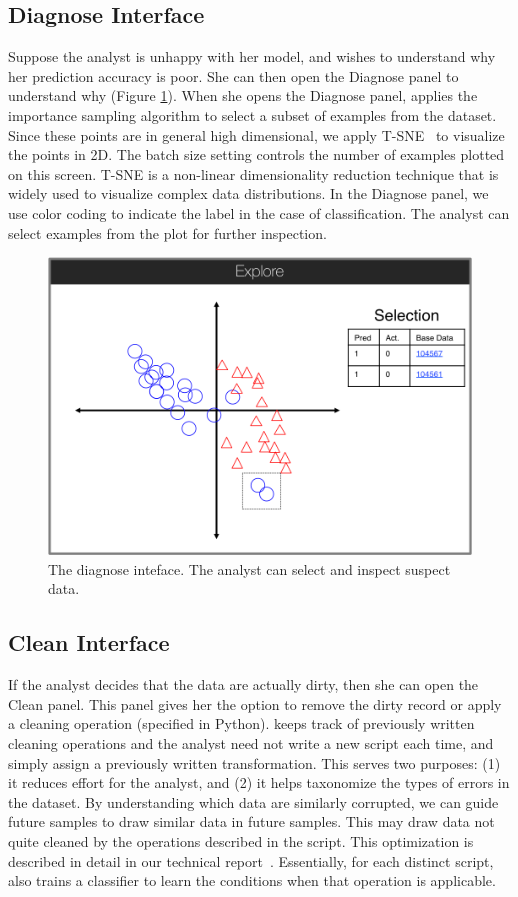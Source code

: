 \subsection{Diagnose Interface}
Suppose the analyst is unhappy with her model, and wishes to understand why her prediction accuracy is poor.
She can then open the \textsf{Diagnose} panel to understand why (Figure \ref{diag}).
When she opens the \textsf{Diagnose} panel, \sys applies the importance sampling algorithm to select a subset of examples from the dataset.
Since these points are in general high dimensional, we apply T-SNE~\cite{van2008visualizing} to visualize the points in 2D.
The batch size setting controls the number of examples plotted on this screen.
T-SNE is a non-linear dimensionality reduction technique that is widely used to visualize complex data distributions.
In the \textsf{Diagnose} panel, we use color coding to indicate the label in the case of classification.
The analyst can select examples from the plot for further inspection.

\begin{figure}[t]
\centering
 \includegraphics[width=0.6\columnwidth]{figs/interface3.png}
 \caption{The diagnose inteface. The analyst can select and inspect suspect data. \label{diag}}
\end{figure}

\subsection{Clean Interface}
If the analyst decides that the data are actually dirty, then she can open the \textsf{Clean} panel.
This panel gives her the option to remove the dirty record or apply a cleaning operation (specified in Python).
\sys keeps track of previously written cleaning operations and the analyst need not write a new script each time, and simply assign a previously written transformation. 
This serves two purposes: (1) it reduces effort for the analyst, and (2) it helps \sys taxonomize the types of errors in the dataset.
By understanding which data are similarly corrupted, we can guide future samples to draw similar data in future samples.
This may draw data not quite cleaned by the operations described in the script.
This optimization is described in detail in our technical report~\cite{activecleanarxiv}. 
Essentially, for each distinct script, \sys also trains a classifier to learn the conditions when that operation is applicable.

